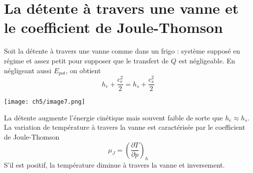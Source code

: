 \section{La détente à travers une vanne et le coefficient de Joule-Thomson}
Soit la détente à travers une vanne comme dans un frigo : système supposé en 
régime et assez petit pour supposer que le transfert de $Q$ est négligeable. 
En négligeant aussi $E_{pot}$, on obtient
\begin{equation}
h_e +\frac{c_e^2}{2}=h_s+\frac{c_s^2}{2}
\end{equation}
\begin{center}
	\texttt{[image: ch5/image7.png]}
\end{center}
La détente augmente l'énergie cinétique mais souvent faible de sorte que 
$h_e\approx h_s$. La variation de température à travers la vanne est 
caractérisée par le coefficient de Joule-Thomson 
\begin{equation}
\mu_J = \left(\frac{\partial T}{\partial p}\right)_h
\end{equation}
S'il est positif, la température diminue à travers la vanne et inversement.



